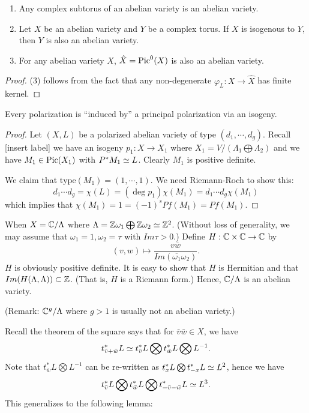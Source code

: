 \begin{corollary}
\noindent
\begin{enumerate}
\item Any complex subtorus of an abelian variety is an abelian variety.
\item Let $X$ be an abelian variety and $Y$ be a complex torus. If $X$ is isogenous to $Y$, then $Y$ is also an abelian variety. 
\item For any abelian variety $X$, $\hat{X}=\operatorname{Pic}^0(X)$ is also an abelian variety.
\end{enumerate}
\end{corollary}

\begin{proof}
(3) follows from the fact that any non-degenerate $\varphi_L:X\to \hat{X}$ has finite kernel.
\end{proof}

\begin{lemma}
Every polarization is ``induced by'' a principal polarization via an isogeny. 
\end{lemma}

\begin{proof}
Let $(X,L)$ be a polarized abelian variety of type $(d_1,\cdots, d_g)$. Recall [insert label] we have an isogeny $p_1: X\to X_1$ where $X_1=V/(\Lambda_1\bigoplus \Lambda_2)$ and we have $M_1\in \operatorname{Pic}(X_1)$ with $P^* M_1\simeq L$. Clearly $M_1$ is positive definite. 

We claim that $\text{type}(M_1)=(1,\cdots,1)$. We need Riemann-Roch to show this:
\[
d_1\cdots d_g = \chi(L)=(\deg p_1)\chi(M_1)=d_1\cdots d_g \chi(M_1)
\]
which implies that $\chi(M_1)=1=(-1)^s Pf(M_1)=Pf(M_1)$. 
\end{proof}

\begin{example}
When $X={\mathbb C}/\Lambda$ where $\Lambda={\mathbb Z} \omega_1 \bigoplus {\mathbb Z} \omega_2\simeq {\mathbb Z}^2$. (Without loss of generality, we may assume that $\omega_1=1, \omega_2 = \tau$ with $Im \tau>0$.) Define $H:{\mathbb C}\times {\mathbb C}\to {\mathbb C}$ by 
$$(v,w)\mapsto \frac{v\overline{ w}}{Im(\overline{\omega_1}\omega_2)}.$$
$H$ is obviously positive definite.
It is easy to show that $H$ is Hermitian and that $Im(H(\Lambda,\Lambda))\subset {\mathbb Z}$. (That is, $H$ is a Riemann form.) Hence, ${\mathbb C}/\Lambda$ is an abelian variety. 

(Remark: ${\mathbb C}^g/\Lambda$ where $g>1$ is usually not an abelian variety.)
\end{example}

Recall the theorem of the square says that for $\bar{v}\bar{w}\in X$, we have
\[
t^*_{\bar{v}+\bar{w}}L \simeq t^*_{\bar{v}}L \bigotimes t^*_{\bar{w}}L \bigotimes L^{-1}.
\]
Note that $t^*_{\bar{w}}L \bigotimes L^{-1}$ can be re-written as $t^*_xL\bigotimes t^*_{-x}L\simeq L^2$, hence we have 
\[
t^*_{\bar{v}}L \bigotimes t^*_{\bar{w}}L \bigotimes t^*_{-\bar{v}-\bar{w}}L \simeq L^3.
\]
This generalizes to the following lemma:

